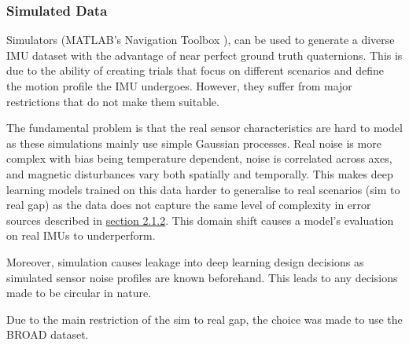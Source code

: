 \subsubsection{Simulated Data}
Simulators (MATLAB's Navigation Toolbox \cite{mathworks_navigation_toolbox}),
can be used to generate a diverse IMU dataset with the advantage of 
near perfect ground truth
quaternions. This is due to the ability of creating trials that focus on
different scenarios and define the motion profile the IMU undergoes. However, 
they suffer from major restrictions that do not make them suitable.

The fundamental problem is that the real sensor characteristics are hard to
model as these simulations mainly use simple Gaussian processes. Real noise
is more complex with bias being temperature dependent, noise is correlated
across axes, and magnetic disturbances vary both spatially and temporally. 
This makes deep learning models trained on this data harder to generalise 
to real scenarios (sim to real gap) as the data does not capture the same level of complexity
in error sources described in \hyperref[sec:gyroerrors]{section 2.1.2}. This
domain shift causes a model's evaluation on real IMUs to underperform. 

Moreover, simulation causes leakage into deep learning design decisions as
simulated sensor noise profiles are known beforehand. This leads to any
decisions made to be circular in nature.

Due to the main restriction of the sim to real gap, the choice was made to use the BROAD dataset.

